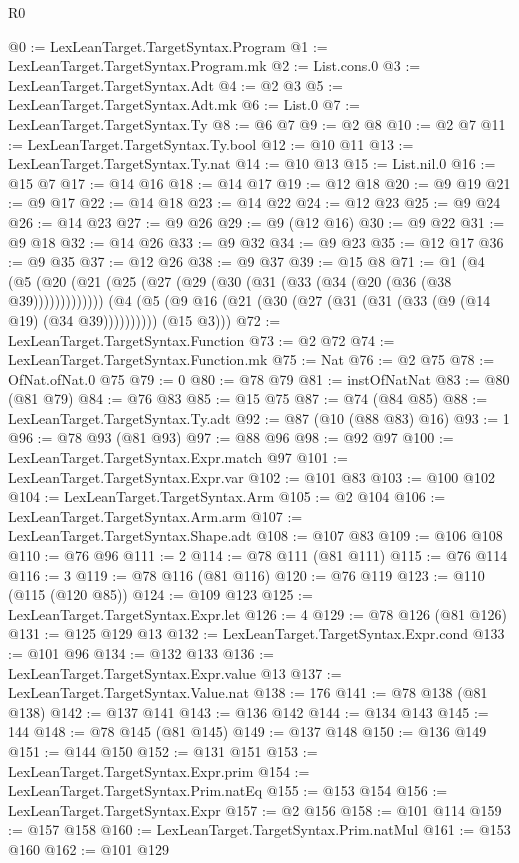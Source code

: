 \begin{lexlean}{R0}
\begin{coremodule}
@0 := LexLeanTarget.TargetSyntax.Program
@1 := LexLeanTarget.TargetSyntax.Program.mk
@2 := List.cons.{0}
@3 := LexLeanTarget.TargetSyntax.Adt
@4 := @2 @3
@5 := LexLeanTarget.TargetSyntax.Adt.mk
@6 := List.{0}
@7 := LexLeanTarget.TargetSyntax.Ty
@8 := @6 @7
@9 := @2 @8
@10 := @2 @7
@11 := LexLeanTarget.TargetSyntax.Ty.bool
@12 := @10 @11
@13 := LexLeanTarget.TargetSyntax.Ty.nat
@14 := @10 @13
@15 := List.nil.{0}
@16 := @15 @7
@17 := @14 @16
@18 := @14 @17
@19 := @12 @18
@20 := @9 @19
@21 := @9 @17
@22 := @14 @18
@23 := @14 @22
@24 := @12 @23
@25 := @9 @24
@26 := @14 @23
@27 := @9 @26
@29 := @9 (@12 @16)
@30 := @9 @22
@31 := @9 @18
@32 := @14 @26
@33 := @9 @32
@34 := @9 @23
@35 := @12 @17
@36 := @9 @35
@37 := @12 @26
@38 := @9 @37
@39 := @15 @8
@71 := @1
    (@4
      (@5 (@20 (@21 (@25 (@27 (@29 (@30 (@31 (@33 (@34 (@20 (@36 (@38 @39)))))))))))))
      (@4 (@5 (@9 @16 (@21 (@30 (@27 (@31 (@31 (@33 (@9 (@14 @19) (@34 @39)))))))))) (@15 @3)))
@72 := LexLeanTarget.TargetSyntax.Function
@73 := @2 @72
@74 := LexLeanTarget.TargetSyntax.Function.mk
@75 := Nat
@76 := @2 @75
@78 := OfNat.ofNat.{0} @75
@79 := 0
@80 := @78 @79
@81 := instOfNatNat
@83 := @80 (@81 @79)
@84 := @76 @83
@85 := @15 @75
@87 := @74 (@84 @85)
@88 := LexLeanTarget.TargetSyntax.Ty.adt
@92 := @87 (@10 (@88 @83) @16)
@93 := 1
@96 := @78 @93 (@81 @93)
@97 := @88 @96
@98 := @92 @97
@100 := LexLeanTarget.TargetSyntax.Expr.match @97
@101 := LexLeanTarget.TargetSyntax.Expr.var
@102 := @101 @83
@103 := @100 @102
@104 := LexLeanTarget.TargetSyntax.Arm
@105 := @2 @104
@106 := LexLeanTarget.TargetSyntax.Arm.arm
@107 := LexLeanTarget.TargetSyntax.Shape.adt
@108 := @107 @83
@109 := @106 @108
@110 := @76 @96
@111 := 2
@114 := @78 @111 (@81 @111)
@115 := @76 @114
@116 := 3
@119 := @78 @116 (@81 @116)
@120 := @76 @119
@123 := @110 (@115 (@120 @85))
@124 := @109 @123
@125 := LexLeanTarget.TargetSyntax.Expr.let
@126 := 4
@129 := @78 @126 (@81 @126)
@131 := @125 @129 @13
@132 := LexLeanTarget.TargetSyntax.Expr.cond
@133 := @101 @96
@134 := @132 @133
@136 := LexLeanTarget.TargetSyntax.Expr.value @13
@137 := LexLeanTarget.TargetSyntax.Value.nat
@138 := 176
@141 := @78 @138 (@81 @138)
@142 := @137 @141
@143 := @136 @142
@144 := @134 @143
@145 := 144
@148 := @78 @145 (@81 @145)
@149 := @137 @148
@150 := @136 @149
@151 := @144 @150
@152 := @131 @151
@153 := LexLeanTarget.TargetSyntax.Expr.prim
@154 := LexLeanTarget.TargetSyntax.Prim.natEq
@155 := @153 @154
@156 := LexLeanTarget.TargetSyntax.Expr
@157 := @2 @156
@158 := @101 @114
@159 := @157 @158
@160 := LexLeanTarget.TargetSyntax.Prim.natMul
@161 := @153 @160
@162 := @101 @129

\end{coremodule}
\end{lexlean}
